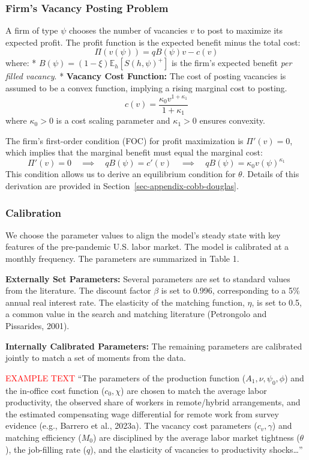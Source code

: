 \documentclass[
  11pt,
  letterpaper,
  DIV=11,
  numbers=noendperiod]{scrartcl}
\begin{document}
\subsubsection{Firm's Vacancy Posting
Problem}\label{firms-vacancy-posting-problem}

A firm of type \(\psi\) chooses the number of vacancies \(v\) to post to
maximize its expected profit. The profit function is the expected
benefit minus the total cost: \[
\Pi(v(\psi)) = q B(\psi)  v - c(v)
\] where: * \(B(\psi) = (1-\xi)\mathbb{E}_h[S(h,\psi)^{+}]\) is the
firm's expected benefit \emph{per filled vacancy}. * \textbf{Vacancy
Cost Function:} The cost of posting vacancies is assumed to be a convex
function, implying a rising marginal cost to posting.
\[c(v) = \frac{\kappa_{0} v^{1+\kappa_{1}}}{1+\kappa_{1}}\] where
\(\kappa_{0} > 0\) is a cost scaling parameter and \(\kappa_{1} > 0\)
ensures convexity.

The firm's first-order condition (FOC) for profit maximization is
\(\Pi'(v) = 0\), which implies that the marginal benefit must equal the
marginal cost: \[
\Pi'(v) = 0 \quad \implies \quad q B(\psi) = c'(v) \quad \implies \quad q B(\psi) = \kappa_{0} v(\psi)^{\kappa_{1}}
\] This condition allows us to derive an equilibrium condition for
\(\theta\). Details of this derivation are provided in
Section~\ref{sec-appendix-cobb-douglas}.

\subsubsection{Calibration}\label{calibration-1}

We choose the parameter values to align the model's steady state with
key features of the pre-pandemic U.S. labor market. The model is
calibrated at a monthly frequency. The parameters are summarized in
Table 1.

\textbf{Externally Set Parameters:} Several parameters are set to
standard values from the literature. The discount factor \(\beta\) is
set to 0.996, corresponding to a 5\% annual real interest rate. The
elasticity of the matching function, \(\eta\), is set to 0.5, a common
value in the search and matching literature (Petrongolo and Pissarides,
2001).

\textbf{Internally Calibrated Parameters:} The remaining parameters are
calibrated jointly to match a set of moments from the data.

\textcolor{red}{EXAMPLE TEXT} ``The parameters of the production
function (\(A_1, \nu, \psi_0, \phi\)) and the in-office cost function
(\(c_0, \chi\)) are chosen to match the average labor productivity, the
observed share of workers in remote/hybrid arrangements, and the
estimated compensating wage differential for remote work from survey
evidence (e.g., Barrero et al., 2023a). The vacancy cost parameters
(\(c_v, \gamma\)) and matching efficiency (\(M_0\)) are disciplined by
the average labor market tightness (\(\theta\)), the job-filling rate
(\(q\)), and the elasticity of vacancies to productivity
shocks\ldots{}''
\end{document}
